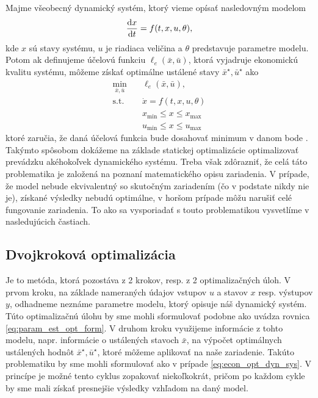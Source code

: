 Majme všeobecný dynamický systém, ktorý vieme opísať nasledovným modelom
\begin{equation*}
	\frac{\text{d}x}{\text{d}t} = f(t, x, u, \theta),
\end{equation*}
kde $ x $ sú stavy systému, $ u $ je riadiaca veličina a $ \theta $ predstavuje parametre modelu. Potom ak definujeme účelovú funkciu $ \ell_e(\bar{x},\bar{u}) $, ktorá vyjadruje ekonomickú kvalitu systému, môžeme získať optimálne ustálené stavy $ \bar{x}^{\star}, \bar{u}^{\star} $ ako
\begin{equation}
	\begin{split}
		\min_{\bar{x},\bar{u}}& \quad \ell_e(\bar{x},\bar{u}), \\
		\text{s.t.}& \quad \dot{x} = f(t, x, u, \theta) \\
		& \quad x_{\min} \leq x \leq x_{\max} \\
		& \quad u_{\min} \leq x \leq u_{\max}
	\end{split}
	\label{eq:econ_opt_dyn_sys}
\end{equation}
ktoré zaručia, že daná účelová funkcia bude dosahovať minimum v danom bode \cite{hernandez:economics_opt_w_mismatch:2019}. Takýmto spôsobom dokážeme na základe statickej optimalizácie optimalizovať prevádzku akéhokoľvek dynamického systému. Treba však zdôrazniť, že celá táto problematika je založená na poznaní matematického opisu zariadenia. V prípade, že model nebude ekvivalentný so skutočným zariadením (čo v podstate nikdy nie je), získané výsledky nebudú optimálne, v horšom prípade môžu narušiť celé fungovanie zariadenia. To ako sa vysporiadať s touto problematikou vysvetlíme v nasledujúcich častiach.

\subsection{Dvojkroková optimalizácia}
Je to metóda, ktorá pozostáva z
2 krokov, resp. z 2 optimalizačných úloh. V prvom kroku, na základe nameraných údajov vstupov $ u $ a stavov $ x $ resp. výstupov $ y $, odhadneme neznáme parametre modelu, ktorý opisuje náš dynamický systém. Túto optimalizačnú úlohu by sme mohli sformulovať podobne ako uvádza rovnica \ref{eq:param_est_opt_form}. V druhom kroku využijeme informácie z tohto modelu, napr. informácie o ustálených stavoch $ \bar{x} $, na výpočet optimálnych ustálených hodnôt $ \bar{x}^{\star}, \bar{u}^{\star} $, ktoré môžeme aplikovať na naše zariadenie. Takúto problematiku by sme mohli sformulovať ako v prípade \ref{eq:econ_opt_dyn_sys}. V princípe je možné tento cyklus zopakovať niekoľkokrát, pričom po každom cykle by sme mali získať presnejšie výsledky vzhľadom na daný model.

